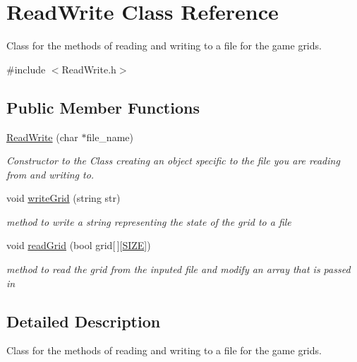 \hypertarget{class_read_write}{}\section{Read\+Write Class Reference}
\label{class_read_write}


Class for the methods of reading and writing to a file for the game grids.  




{\ttfamily \#include $<$Read\+Write.\+h$>$}

\subsection*{Public Member Functions}
\begin{DoxyCompactItemize}
\item 
\mbox{\hyperlink{class_read_write_a09a19526aaaf1fe51d40cc6373215141}{Read\+Write}} (char $\ast$file\+\_\+name)
\begin{DoxyCompactList}\small\item\em Constructor to the Class creating an object specific to the file you are reading from and writing to. \end{DoxyCompactList}\item 
void \mbox{\hyperlink{class_read_write_a48aaf174d30259941f8bc28c7a097254}{write\+Grid}} (string str)
\begin{DoxyCompactList}\small\item\em method to write a string representing the state of the grid to a file \end{DoxyCompactList}\item 
void \mbox{\hyperlink{class_read_write_aa254bc718dc3e9f29b314a305f2eee3f}{read\+Grid}} (bool grid\mbox{[}$\,$\mbox{]}\mbox{[}\mbox{\hyperlink{_read_write_8h_a70ed59adcb4159ac551058053e649640}{S\+I\+ZE}}\mbox{]})
\begin{DoxyCompactList}\small\item\em method to read the grid from the inputed file and modify an array that is passed in \end{DoxyCompactList}\end{DoxyCompactItemize}


\subsection{Detailed Description}
Class for the methods of reading and writing to a file for the game grids. 

